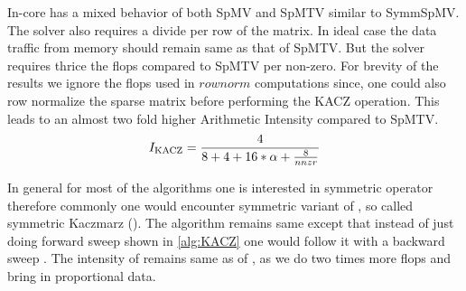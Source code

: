 In-core has a mixed behavior of both SpMV and SpMTV similar to SymmSpMV. The solver also requires a divide per  row of the matrix. In ideal case the data traffic from memory should remain same as that of SpMTV. But the solver requires thrice the flops compared to SpMTV per non-zero. For brevity of the results we ignore the flops used in $rownorm$ computations since, one could also row normalize the sparse matrix before performing the KACZ operation. This leads to an almost two fold higher Arithmetic Intensity compared to SpMTV.
\begin{equation}
\label{eq:KACZ_intensity}
I_\mathrm{KACZ} =  \frac{4}{8+4+16*\alpha+\frac{8}{nnzr}} \\%
\end{equation}

In general for most of the algorithms one is interested in symmetric operator therefore commonly one would encounter symmetric variant of \KACZ, so called symmetric Kaczmarz (\SYMMKACZ). The algorithm remains same except that instead of just doing forward sweep shown in \cref{alg:KACZ} one would follow it with a backward sweep . The intensity of \SYMMKACZ remains same as of \KACZ, as we do two times more flops and bring in proportional data.
